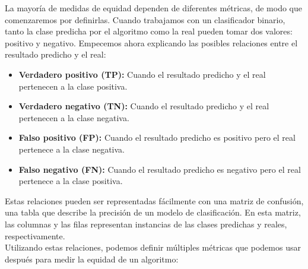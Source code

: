 \documentclass[runningheads,a4paper]{llncs}
\begin{document}
La mayor\'ia de medidas de equidad dependen de diferentes m\'etricas, de modo que comenzaremos por definirlas. Cuando trabajamos con un clasificador binario, tanto la clase predicha por el algoritmo como la real pueden tomar dos valores: positivo y negativo. Empecemos ahora explicando las posibles relaciones entre el resultado predicho y el real: 
\begin{itemize}
\item {\bf Verdadero positivo (TP):} Cuando el resultado predicho y el real pertenecen a la clase positiva.\\
\item {\bf Verdadero negativo (TN):} Cuando el resultado predicho y el real pertenecen a la clase negativa.\\
\item {\bf Falso positivo (FP): }Cuando el resultado predicho es positivo pero el real pertenece a la clase negativa.\\
\item {\bf Falso negativo (FN): }Cuando el resultado predicho es negativo pero el real pertenece a la clase positiva.\\
\end{itemize}
    
Estas relaciones pueden ser representadas f\'acilmente con una matriz de confusi\'on, una tabla que describe la precisi\'on de un modelo de clasificaci\'on. En esta matriz, las columnas y las filas representan instancias de las clases predichas y reales, respectivamente.\\

Utilizando estas relaciones, podemos definir m\'ultiples m\'etricas que podemos usar despu\'es para medir la equidad de un algoritmo: \\
\end{document}
